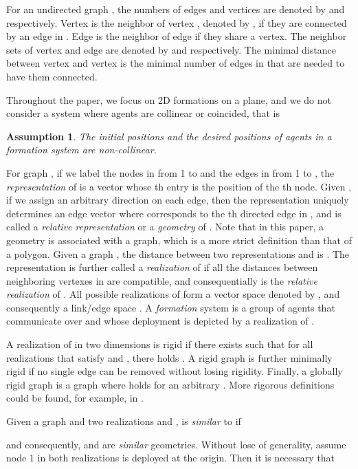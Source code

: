 \documentclass[times]{rncauth}
\newtheorem{assum}{Assumption}[section]
\begin{document}
  For an undirected graph , the numbers of edges and vertices are
  denoted by  and  respectively.
Vertex  is the neighbor of vertex , denoted by , if
they are connected by an edge in . Edge  is the neighbor of
edge  if they share a vertex. The neighbor sets of vertex  and
edge  are denoted by  and 
respectively. The minimal distance between vertex  and vertex 
is the minimal number of  edges in  that are needed to have them
connected.


Throughout the paper, we focus on 2D formations on a plane, and we
do not consider a system where agents are collinear or coincided,
that is
\begin{assum}\label{assumption_generic}
The initial positions and the desired positions of agents in a
formation system are non-collinear.
\end{assum}


For graph , if we label the nodes in  from 1 to  and the
edges in  from 1 to , the \emph{representation} of  is a
vector  whose th entry  is the
position of the th node. Given , if we assign an arbitrary
direction on each edge, then the  representation 
uniquely determines an edge vector  where  corresponds to the th directed edge in , and
 is called a \emph{relative representation} or a
\emph{geometry} of . Note that in this paper, a geometry is
associated with a graph, which is a more strict definition than that
of a polygon. Given a graph , the distance between two
representations  and  is
. The
representation  is further called a \emph{realization}
of  if all the distances between neighboring vertexes in  are compatible, and consequentially  is the \emph{relative
realization} of .
 All possible realizations of  form a vector space denoted by
, and consequently a link/edge space .  A
\emph{formation} system is a group of agents that communicate over
 and whose deployment is depicted by a realization of .

A realization  of  in two dimensions is rigid if
there exists  such that for all realizations
 that satisfy  and , there
holds . A rigid graph is
further minimally rigid if no single edge can be removed without
losing rigidity. Finally, a globally rigid graph  is a graph
where  holds for an
arbitrary . More rigorous definitions could be found,
for example, in
\cite{Yu09minimalPersistent,Anderson08rigidMagazine}.

Given a graph  and two realizations   and
,  is \emph{similar} to 
if

and consequently,   and  are \emph{similar}
geometries. Without lose of generality, assume node 1 in both
realizations is deployed at the origin. Then it is necessary that
\end{document}
